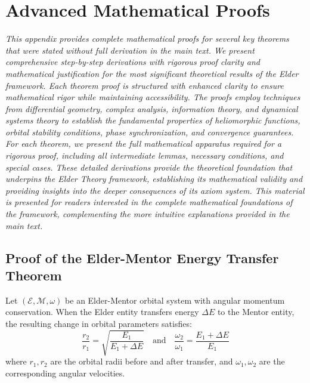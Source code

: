 \chapter{Advanced Mathematical Proofs}

\textit{This appendix provides complete mathematical proofs for several key theorems that were stated without full derivation in the main text. We present comprehensive step-by-step derivations with rigorous proof clarity and mathematical justification for the most significant theoretical results of the Elder framework. Each theorem proof is structured with enhanced clarity to ensure mathematical rigor while maintaining accessibility. The proofs employ techniques from differential geometry, complex analysis, information theory, and dynamical systems theory to establish the fundamental properties of heliomorphic functions, orbital stability conditions, phase synchronization, and convergence guarantees. For each theorem, we present the full mathematical apparatus required for a rigorous proof, including all intermediate lemmas, necessary conditions, and special cases. These detailed derivations provide the theoretical foundation that underpins the Elder Theory framework, establishing its mathematical validity and providing insights into the deeper consequences of its axiom system. This material is presented for readers interested in the complete mathematical foundations of the framework, complementing the more intuitive explanations provided in the main text.}

\section{Proof of the Elder-Mentor Energy Transfer Theorem}

\begin{theorem}
Let $(\mathcal{E}, \mathcal{M}, \omega)$ be an Elder-Mentor orbital system with angular momentum conservation. When the Elder entity transfers energy $\Delta E$ to the Mentor entity, the resulting change in orbital parameters satisfies:
\begin{equation}
\frac{r_2}{r_1} = \sqrt{\frac{E_1}{E_1 + \Delta E}} \quad \text{and} \quad \frac{\omega_2}{\omega_1} = \frac{E_1 + \Delta E}{E_1}
\end{equation}
where $r_1, r_2$ are the orbital radii before and after transfer, and $\omega_1, \omega_2$ are the corresponding angular velocities.
\end{theorem}

